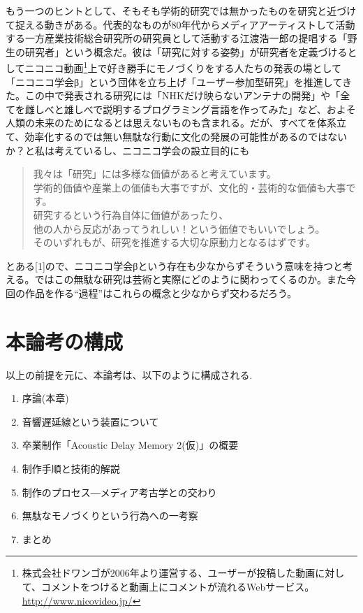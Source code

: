 もう一つのヒントとして、そもそも学術的研究では無かったものを研究と近づけて捉える動きがある。代表的なものが80年代からメディアアーティストして活動する一方産業技術総合研究所の研究員として活動する江渡浩一郎の提唱する「野生の研究者」という概念だ。彼は「研究に対する姿勢」が研究者を定義づけるとしてニコニコ動画\footnote{株式会社ドワンゴが2006年より運営する、ユーザーが投稿した動画に対して、コメントをつけると動画上にコメントが流れるWebサービス。\url{http://www.nicovideo.jp/}}上で好き勝手にモノづくりをする人たちの発表の場として「ニコニコ学会β」という団体を立ち上げ「ユーザー参加型研究」を推進してきた。この中で発表される研究には「NHKだけ映らないアンテナの開発」や「全てを雌しべと雄しべで説明するプログラミング言語を作ってみた」など、およそ人類の未来のためになるとは思えないものも含まれる。だが、すべてを体系立て、効率化するのでは無い無駄な行動に文化の発展の可能性があるのではないか？と私は考えているし、ニコニコ学会の設立目的にも

\begin{quote}
我々は「研究」には多様な価値があると考えています。\\
学術的価値や産業上の価値も大事ですが、文化的・芸術的な価値も大事です。\\
研究するという行為自体に価値があったり、\\
他の人から反応があってうれしい！という価値でもいいでしょう。\\
そのいずれもが、研究を推進する大切な原動力となるはずです。
\end{quote}

とある{[}1{]}ので、ニコニコ学会βという存在も少なからずそういう意味を持つと考える。ではこの無駄な研究は芸術と実際にどのように関わってくるのか。また今回の作品を作る``過程''はこれらの概念と少なからず交わるだろう。\\

\section{本論考の構成}\label{ux672cux8ad6ux8003ux306eux69cbux6210}

以上の前提を元に、本論考は、以下のように構成される.

\begin{enumerate}
\def\labelenumi{\arabic{enumi}.}
\tightlist
\item
  序論(本章)
\item
  音響遅延線という装置について
\item
  卒業制作「Acoustic Delay Memory 2(仮)」の概要
\item
  制作手順と技術的解説
\item
  制作のプロセス―メディア考古学との交わり
\item
  無駄なモノづくりという行為への一考察
\item
  まとめ
\end{enumerate}

